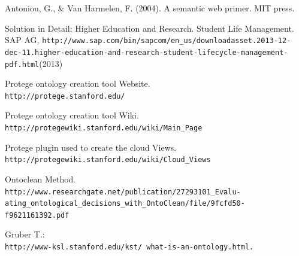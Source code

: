 \documentclass{article}    %
\begin{document}
%
%
\begin{thebibliography}{99}
%
Antoniou, G., \& Van Harmelen, F. (2004). A semantic web primer. MIT press.

Solution in Detail: Higher Education and Research. Student Life Management.
SAP AG, \texttt{http://www.sap.com/bin/sapcom/en\_us/downloadasset.2013-12-dec-11.higher-education-and-research-student-lifecycle-\newline management-pdf.html}(2013)

Protege ontology creation tool Website.\\
\texttt{http://protege.stanford.edu/}

Protege ontology creation tool Wiki.\\
\texttt{http://protegewiki.stanford.edu/wiki/Main\_Page}

Protege plugin used to create the cloud Views.\\
\texttt{http://protegewiki.stanford.edu/wiki/Cloud\_Views}

Ontoclean Method.\\
\texttt{http://www.researchgate.net/publication/27293101\_Evalu-\newline
ating\_ontological\_decisions\_with\_OntoClean/file/9fcfd50-\newline
f9621161392.pdf}

Gruber T.:
\\
\texttt{http://www-ksl.stanford.edu/kst/ what-is-an-ontology.html.} 



\end{thebibliography}
\end{document}
